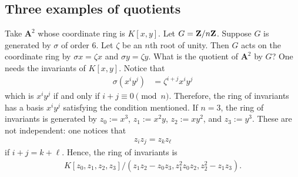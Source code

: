 \documentclass [11 pt, oneside, margin = 1 in] {article}
\begin{document}
\subsection{Three examples of quotients}
\begin{example}\label{}\text{}
Take $\mathbf{A}^2$ whose coordinate ring is $K[x,y]$. Let $G=\mathbf Z / n\mathbf Z$. Suppose $G$ is generated by $\sigma$ of order $6$. Let $\zeta$ be an $n$th root of unity. Then $G$ acts on the coordinate ring by $\sigma x = \zeta x$ and $\sigma y = \zeta y$. What is the quotient of $\mathbf{A}^2$ by $G$? One needs the invariants of $K[x,y]$. Notice that 
\begin{align*}
	\sigma(x^iy^j) &= \zeta^{i+j} x^iy^j
\end{align*}
which is $x^iy^j$ if and only if $i+j\equiv 0\pmod n$. Therefore, the ring of invariants has a basis $x^iy^j$ satisfying the condition mentioned. If $n=3$, the ring of invariants is generated by $z_0:=x^3$, $z_1:=x^2y$, $z_2:=xy^2$, and $z_3:=y^3$. These are not independent: one notices that
\begin{align*}
	z_iz_j = z_kz_\ell
\end{align*}
if $i+j=k+\ell$. Hence, the ring of invariants is
\begin{align*}
	K[z_0,z_1,z_2,z_3] / (z_1z_2-z_0z_3, z_1^2 z_0z_2, z_2^2-z_1z_3). 
\end{align*}
\end{example}
\end{document}

